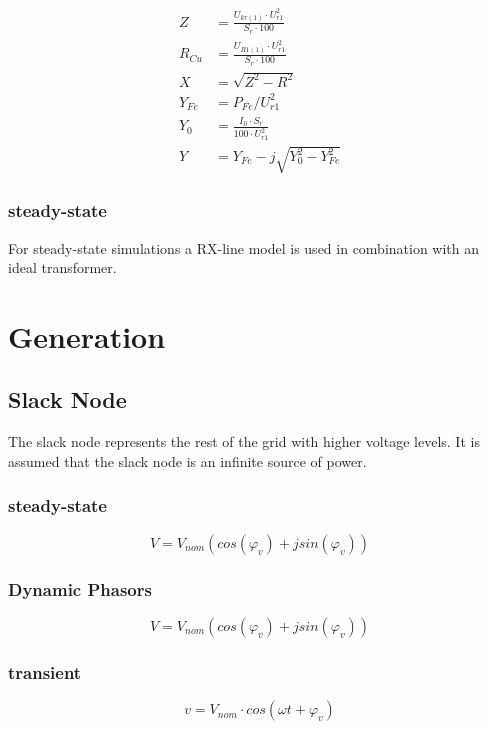 \begin{align}
Z &= \frac{U_{kr(1)} \cdot U_{r1}^2}{S_r \cdot 100} \\
R_{Cu} &= \frac{U_{R1(1)} \cdot U_{r1}^2}{S_r \cdot 100} \\
X &= \sqrt{Z^2-R^2} \\
Y_{Fe} &= P_{Fe}/U_{r1}^2 \\
Y_0 &= \frac{I_0 \cdot S_r}{100 \cdot U_{r1}^2} \\
Y &= Y_{Fe} - j \sqrt{Y_0^2-Y_{Fe}^2} 
\end{align}

\subsubsection{steady-state}
For steady-state simulations a RX-line model is used in combination with an ideal transformer.


\section{Generation}

\subsection{Slack Node}
The slack node represents the rest of the grid with higher voltage levels. It is assumed that the slack node is an infinite source of power.
\subsubsection{steady-state}
\begin{equation}
	V = V_{nom}(cos(\varphi_v)+jsin(\varphi_v))
\end{equation}

\subsubsection{Dynamic Phasors}
\begin{equation}
	V = V_{nom}(cos(\varphi_v)+jsin(\varphi_v))
\end{equation}

\subsubsection{transient}
\begin{equation}
	v = V_{nom} \cdot cos(\omega t + \varphi_v) 
\end{equation}

